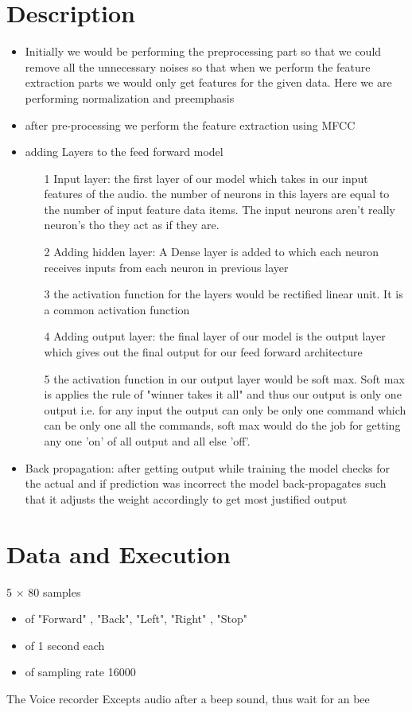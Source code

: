 \documentclass{article}
\begin{document}
\section*{Description}
\begin{itemize}
    \item  { Initially we would be performing the preprocessing part so that we could remove all the unnecessary  noises so that when we perform the feature extraction parts we would only get features for the given data. Here we are performing normalization and preemphasis}
    \item  {  after pre-processing we perform the feature extraction using MFCC }
    \item  {adding Layers to the feed forward model}
    \begin{itemize}
        \item[1] { Input layer: the first layer of our model which takes in our input features of the    audio. the number of neurons in this layers are equal to the number of input feature data items. The input neurons aren't really neuron's tho they act as if they are.}
        \item[2] {Adding hidden layer: A Dense layer is added to which each neuron receives inputs from each neuron in previous layer}
        \item[3] the activation function for the layers would be rectified linear unit. It is a common activation function
        \item[4] {Adding output layer: the final layer of our model is the output layer which gives out the final output for our feed forward architecture }
        \item[5] the activation function in our output layer would be soft max. Soft max is applies the rule of "winner takes it all" and thus our output is only one output i.e. for any input the output can only be only one command which can be only one all the commands, soft max would do the job for getting any one 'on' of all output and all else 'off'.
    \end{itemize}
    \item {Back propagation: after getting output while training the model checks for the actual and if prediction was incorrect the model back-propagates such that it adjusts the weight accordingly to get most justified output}
\end{itemize}

\section*{Data and Execution}
5 $\times$ 80 samples
\begin{itemize}
    \item {of "Forward" , "Back", "Left", "Right" , "Stop"}
    \item {of 1 second each}
    \item {of sampling rate 16000}
\end{itemize}
The Voice recorder Excepts audio after a beep sound, thus wait for an bee
\end{document}

